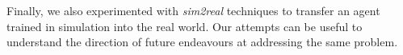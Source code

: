 
Finally, we also experimented with \textit{sim2real} techniques to transfer an agent trained in simulation into the real world. Our attempts can be useful to understand the direction of future endeavours at addressing the same problem.

